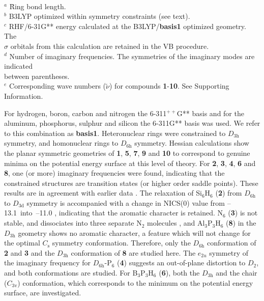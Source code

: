 \begin{table}[htp]
\begin{center}
\begin{tabular}{c r r r c c}
\\
\end{tabular}
\\
\flushleft
\begin{tabbing}
${}^{a}$ \= Ring bond length.\\
${}^{b}$ \> B3LYP optimized within symmetry constraints (see text).\\
${}^{c}$ \> RHF/6-31G** energy calculated at the B3LYP/\textbf{basis1} optimized geometry. The \\
              \> $\sigma$ orbitals from this calculation are retained in the VB procedure.\\
${}^{d}$ \> Number of imaginary frequencies. The symmetries of the imaginary modes are indicated\\ 
                \> between parentheses.  \\
${}^e$ \> Corresponding wave numbers ($\tilde{\nu}$) for compounds \textbf{1}-\textbf{10}. See Supporting Information. \\
\end{tabbing}
\label{ch6.table1}
\end{center}
\end{table}
For hydrogen, boron, carbon and nitrogen the \mbox{6-311$^{++}$G**} basis \cite{bs6_light,bs311ss,bspp}
and for the aluminum, phosphorus, sulphur and silicon the
\mbox{6-311G**} \cite{bs6_heavy,bs311ss} basis was used. We refer to this
combination as \textbf{basis1}. Heteronuclear rings were constrained
to $D_{\mathrm{3h}}$ symmetry, and homonuclear rings to
$D_{\mathrm{6h}}$ symmetry. Hessian calculations show the planar
symmetric geometries of \textbf{1}, \textbf{5}, \textbf{7}, \textbf{9} and
\textbf{10} to correspond to genuine minima on the potential energy
surface at this level of theory. For \textbf{2}, \textbf{3}, \textbf{4},
\textbf{6} and \textbf{8}, one (or more) imaginary frequencies were found,
indicating that the constrained structures are transition states (or higher order
saddle points). These results are in agreement with earlier
data \cite{geo1,geo2,geo3,geo4,geo5}. The relaxation of Si$_6$H$_6$ (\textbf{2}) from $D_\mathrm{6h}$
to $D_\mathrm{3d}$ symmetry is accompanied with a change in NICS(0) value from \mbox{--13.1 into
--11.0} \cite{baldridge}, indicating that the aromatic character is retained.
N$_6$ (\textbf{3}) is not stable, and dissociates into three separate N$_2$ molecules \cite{geo3},
and Al$_3$P$_3$H$_6$ (\textbf{8}) in the $D_\mathrm{3h}$ geometry shows no
aromatic character, a feature which will not change for the optimal $C_\mathrm{s}$ symmetry conformation.
Therefore, only the $D_\mathrm{6h}$ conformation of \textbf{2} and \textbf{3} and the $D_\mathrm{3h}$ conformation
of \textbf{8} are studied here. The $e_{2u}$ symmetry  of the imaginary
frequency for $D_\mathrm{6h}$-P$_6$ (\textbf{4}) suggests an out-of-plane distortion to $D_\mathrm{2}$, and
both conformations are studied. For B$_3$P$_3$H$_6$ (\textbf{6}), both the $D_\mathrm{3h}$ and the
chair ($C_\mathrm{3v}$) conformation, which corresponds to the minimum on
the potential energy surface, are investigated.

